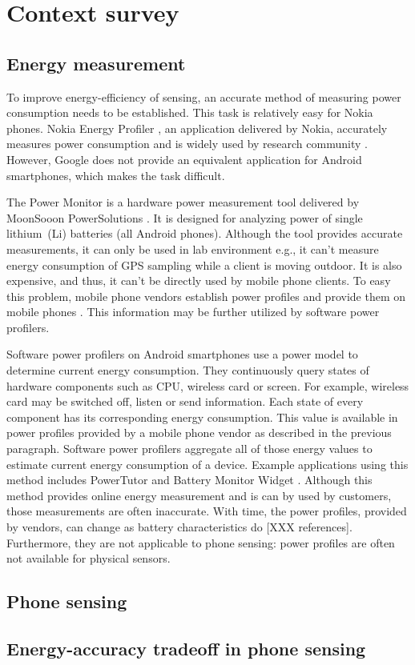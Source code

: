 \section{Context survey}
\label{s:contextsurvey}
\subsection{Energy measurement}
\hspace{10pt} To improve energy-efficiency of sensing, an accurate method of measuring power consumption needs to be established. This task is relatively easy for Nokia phones. Nokia Energy Profiler \cite{nokia:profiler}, an application delivered by Nokia,  accurately measures power consumption and is widely used by research community \cite{kjaergaard:entracked} \cite{lu:jigsaw} \cite{li:status}. However, Google does not provide an equivalent application for Android smartphones, which makes the task difficult.

The Power Monitor is a hardware power measurement tool delivered by MoonSooon PowerSolutions \cite{monsoon:powermonitor}.  It is designed for analyzing power of single lithium\ (Li) batteries (all Android phones). Although the tool provides accurate measurements, it can only be used in lab environment e.g., it can't measure energy consumption of GPS sampling while a client is moving outdoor. It is also expensive, and thus, it can't be directly used by mobile phone clients. To easy this problem, mobile phone vendors establish power profiles and provide them on mobile phones \cite{android:powerprofiles}. This information may be further utilized by software power profilers.

Software power profilers on Android smartphones use a power model to determine current energy consumption. They continuously query states of hardware components such as CPU, wireless card or screen. For example, wireless card may be switched off, listen or send information. Each state of every component has its corresponding energy consumption. This value is available in power profiles provided by a mobile phone vendor as described in the previous paragraph. Software power profilers aggregate all of those energy values to estimate current energy consumption of a device. Example applications using this method includes PowerTutor \cite{zhang:powertutor} and Battery Monitor Widget \cite{googleplay:batterymonitorwidget}. Although this method provides online energy measurement and is can by used by customers, those measurements are often inaccurate. With time, the power profiles, provided by vendors, can change as battery characteristics do [XXX references]. Furthermore, they are not applicable to phone sensing: power profiles are often not available for physical sensors.





\subsection{Phone sensing}
\subsection{Energy-accuracy tradeoff in phone sensing}